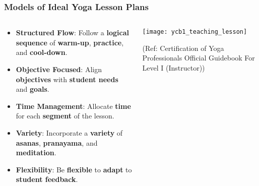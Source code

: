 \begin{frame}[fragile]\frametitle{Models of Ideal Yoga Lesson Plans}
\begin{columns}
    \begin{column}[T]{0.5\linewidth}
      \begin{itemize}
        \item \textbf{Structured Flow}: Follow a \textbf{logical sequence} of \textbf{warm-up}, \textbf{practice}, and \textbf{cool-down}.
        \item \textbf{Objective Focused}: Align \textbf{objectives} with \textbf{student needs} and \textbf{goals}.
        \item \textbf{Time Management}: Allocate \textbf{time} for each \textbf{segment} of the lesson.
        \item \textbf{Variety}: Incorporate a \textbf{variety} of \textbf{asanas}, \textbf{pranayama}, and \textbf{meditation}.
        \item \textbf{Flexibility}: Be \textbf{flexible} to \textbf{adapt} to \textbf{student feedback}.
      \end{itemize}
    \end{column}
    \begin{column}[T]{0.5\linewidth}
        \begin{center}
        \texttt{[image: ycb1\_teaching\_lesson]}
		
		{\tiny (Ref: Certification  of Yoga Professionals Official Guidebook For Level I (Instructor))}	
        \end{center}	
    \end{column}
\end{columns}
\end{frame}

